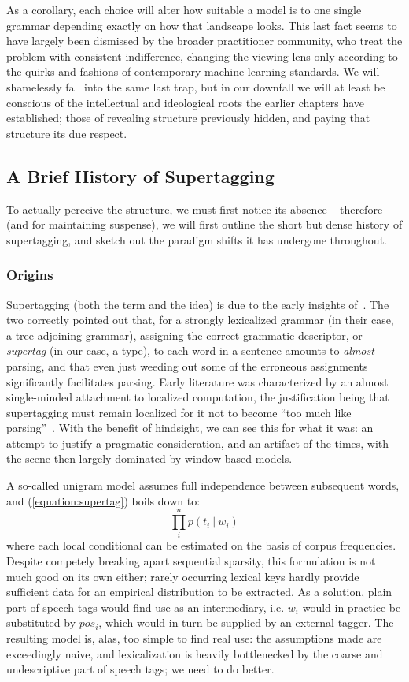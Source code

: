 As a corollary, each choice will alter how suitable a model is to one single grammar depending exactly on how that landscape looks.
This last fact seems to have largely been dismissed by the broader practitioner community, who treat the problem with consistent indifference, changing the viewing lens only according to the quirks and fashions of contemporary machine learning standards.
We will shamelessly fall into the same last trap, but in our downfall we will at least be conscious of the intellectual and ideological roots the earlier chapters have established; those of revealing structure previously hidden, and paying that structure its due respect.

\subsection{A Brief History of Supertagging}
To actually perceive the structure, we must first notice its absence -- therefore (and for maintaining suspense), we will first outline the short but dense history of supertagging, and sketch out the paradigm shifts it has undergone throughout.

\subsubsection{Origins}
Supertagging (both the term and the idea) is due to the early insights of~\citet{joshi1994disambiguation}.
The two correctly pointed out that, for a strongly lexicalized grammar (in their case, a tree adjoining grammar), assigning the correct grammatic descriptor, or \textit{supertag} (in our case, a type), to each word in a sentence amounts to \textit{almost} parsing, and that even just weeding out some of the erroneous assignments significantly facilitates parsing.
Early literature was characterized by an almost single-minded attachment to localized computation, the justification being that supertagging must remain localized for it not to become ``too much like parsing''~\cite{bangalore1999supertagging}.
With the benefit of hindsight, we can see this for what it was: an attempt to justify a pragmatic consideration, and an artifact of the times, with the scene then largely dominated by window-based models.

A so-called unigram model assumes full independence between subsequent words, and (\ref{equation:supertag}) boils down to:
\begin{equation}
\prod_i^n p(t_i \ | \ w_i)
\end{equation}
where each local conditional can be estimated on the basis of corpus frequencies.
Despite competely breaking apart sequential sparsity, this formulation is not much good on its own either; rarely occurring lexical keys hardly provide sufficient data for an empirical distribution to be extracted.
As a solution, plain part of speech tags would find use as an intermediary, i.e. $w_i$ would in practice be substituted by $pos_i$, which would in turn be supplied by an external tagger.
The resulting model is, alas, too simple to find real use: the assumptions made are exceedingly naive, and lexicalization is heavily bottlenecked by the coarse and undescriptive part of speech tags; we need to do better.

